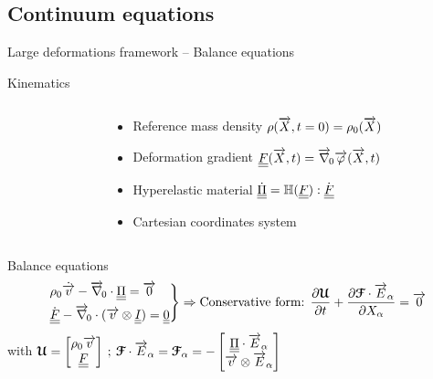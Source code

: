 \subsection{Continuum equations}

\begin{frame}{Large deformations framework -- Balance equations}
  \begin{footnotesize}
    \begin{block}{Kinematics}
      \begin{columns}
        \begin{column}{0.45\textwidth}
          
        \end{column}
        \begin{column}{0.5\textwidth}
          \begin{itemize}
          \item Reference mass density $\rho({\overrightarrow{X}},t=0)=\rho_0({\overrightarrow{X}})$
          \item Deformation gradient ${\underline{\underline{F}}}({\overrightarrow{X}},t)={\overrightarrow{\nabla}}_{\!0}{\overrightarrow{\varphi}}({\overrightarrow{X}},t)$
          \item Hyperelastic material $\dot{{\underline{\underline{\Pi}}}}=\mathbb{H}({\underline{\underline{F}}}) : \dot{{\underline{\underline{F}}}}$
          \item Cartesian coordinates system
          \end{itemize}
        \end{column}
      \end{columns}
    \end{block}
    \begin{block}{Balance equations \cite{Plohr}}
      \begin{equation*}
        \left.\begin{aligned}
            & \rho_0 \dot{{\overrightarrow{v}}} - {\overrightarrow{\nabla}}_{\!0} \cdot {\underline{\underline{\Pi}}} = {\overrightarrow{0}} \\
            & \dot{{\underline{\underline{F}}}} - {\overrightarrow{\nabla}}_{\!0} \cdot ({\overrightarrow{v}} \otimes {\underline{\underline{I}}})= {\underline{\underline{0}}}
          \end{aligned}\right\rbrace \Rightarrow \text{Conservative form: } \frac{\partial {\boldsymbol{\mathcal{U}}}}{\partial t} + \frac{\partial {\boldsymbol{\mathcal{F}}}\cdot{\overrightarrow{E}}_\alpha}{\partial X_\alpha} = {\overrightarrow{0}}
      \end{equation*}
      with ${\boldsymbol{\mathcal{U}}} = \left[\begin{matrix}\rho_0{\overrightarrow{v}} \\ {\underline{\underline{F}}}\end{matrix}\right] \: ; \: {\boldsymbol{\mathcal{F}}}\cdot{\overrightarrow{E}}_\alpha={\boldsymbol{\mathcal{F}}}_\alpha=-\left[\begin{matrix}{\underline{\underline{\Pi}}}\cdot{\overrightarrow{E}}_\alpha\\ {\overrightarrow{v}} \otimes{\overrightarrow{E}}_\alpha\end{matrix}\right]$
    \end{block}
  \end{footnotesize}
\end{frame}

